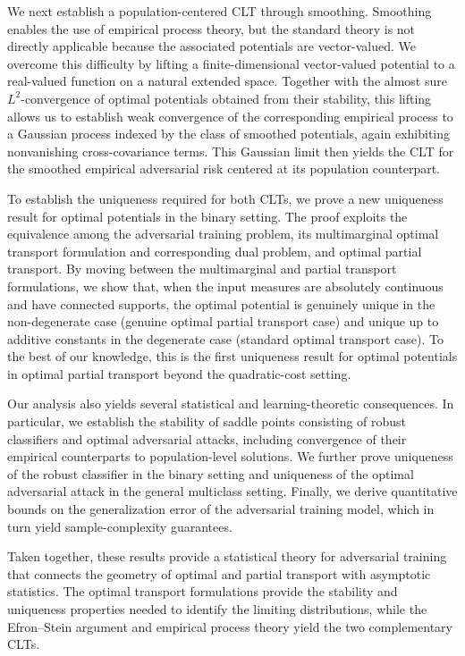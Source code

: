\documentclass{amsart}
\theoremstyle{plain}
\numberwithin{equation}{section}\newtheorem{theorem}{Theorem}[section]
\theoremstyle{remark}
\begin{document}
We next establish a population-centered CLT through smoothing. Smoothing enables the use of empirical process theory, but the standard theory is not directly applicable because the associated potentials are vector-valued. We overcome this difficulty by lifting a finite-dimensional vector-valued potential to a real-valued function on a natural extended space. Together with the almost sure $L^2$-convergence of optimal potentials obtained from their stability, this lifting allows us to establish weak convergence of the corresponding empirical process to a Gaussian process indexed by the class of smoothed potentials, again exhibiting nonvanishing cross-covariance terms. This Gaussian limit then yields the CLT for the smoothed empirical adversarial risk centered at its population counterpart.

To establish the uniqueness required for both CLTs, we prove a new uniqueness result for optimal potentials in the binary setting. The proof exploits the equivalence among the adversarial training problem, its multimarginal optimal transport formulation and corresponding dual problem, and optimal partial transport. By moving between the multimarginal and partial transport formulations, we show that, when the input measures are absolutely continuous and have connected supports, the optimal potential is genuinely unique in the non-degenerate case (genuine optimal partial transport case) and unique up to additive constants in the degenerate case (standard optimal transport case). To the best of our knowledge, this is the first uniqueness result for optimal potentials in optimal partial transport beyond the quadratic-cost setting.

Our analysis also yields several statistical and learning-theoretic consequences. In particular, we establish the stability of saddle points consisting of robust classifiers and optimal adversarial attacks, including convergence of their empirical counterparts to population-level solutions. We further prove uniqueness of the robust classifier in the binary setting and uniqueness of the optimal adversarial attack in the general multiclass setting. Finally, we derive quantitative bounds on the generalization error of the adversarial training model, which in turn yield sample-complexity guarantees.

Taken together, these results provide a statistical theory for adversarial training that connects the geometry of optimal and partial transport with asymptotic statistics. The optimal transport formulations provide the stability and uniqueness properties needed to identify the limiting distributions, while the Efron--Stein argument and empirical process theory yield the two complementary CLTs.
\end{document}
